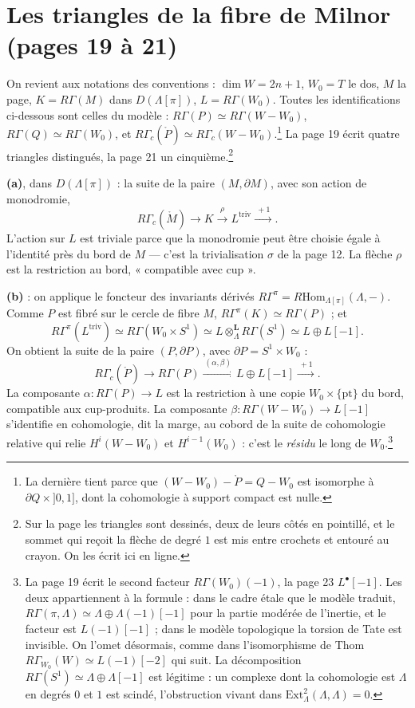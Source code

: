 \documentclass[11pt,a4paper]{article}
\begin{document}
\section*{Les triangles de la fibre de Milnor (pages 19 à 21)}

On revient aux notations des conventions : $\dim W = 2n+1$, $W_0 = T$ le dos,
$M$ la page, $K = R\Gamma(M)$ dans $D(\Lambda[\pi])$, $L = R\Gamma(W_0)$. Toutes
les identifications ci-dessous sont celles du modèle : $R\Gamma(P) \simeq
R\Gamma(W - W_0)$, $R\Gamma(Q) \simeq R\Gamma(W_0)$, et
$R\Gamma_{c}(\mathring{P}) \simeq R\Gamma_{c}(W - W_0)$.\footnote{La dernière
tient parce que $(W - W_0) - \mathring{P} = Q - W_0$ est isomorphe à
$\partial Q \times {]0, 1]}$, dont la cohomologie à support compact est
nulle.} La page 19 écrit quatre triangles distingués, la page 21 un
cinquième.\footnote{Sur la page les triangles sont dessinés, deux de leurs
côtés en pointillé, et le sommet qui reçoit la flèche de degré $1$ est mis
entre crochets et entouré au crayon. On les écrit ici en ligne.}

\textbf{(a)}, dans $D(\Lambda[\pi])$ : la suite de la paire $(M, \partial M)$,
avec son action de monodromie,
\[
  R\Gamma_{c}(\mathring{M}) \longrightarrow K \xrightarrow{\ \rho\ } L^{\mathrm{triv}}
  \xrightarrow{\ +1\ } .
\]
L'action sur $L$ est triviale parce que la monodromie peut être choisie égale à
l'identité près du bord de $M$ — c'est la trivialisation $\sigma$ de la page
12. La flèche $\rho$ est la restriction au bord, « compatible avec cup ».

\textbf{(b)} : on applique le foncteur des invariants dérivés
$R\Gamma^{\pi} = R\mathrm{Hom}_{\Lambda[\pi]}(\Lambda, -)$. Comme $P$ est fibré
sur le cercle de fibre $M$, $R\Gamma^{\pi}(K) \simeq R\Gamma(P)$ ; et
\[
  R\Gamma^{\pi}(L^{\mathrm{triv}}) \simeq R\Gamma(W_0 \times S^{1})
  \simeq L \otimes^{\mathbf{L}}_{\Lambda} R\Gamma(S^{1}) \simeq L \oplus L[-1] .
\]
On obtient la suite de la paire $(P, \partial P)$, avec
$\partial P = S^{1} \times W_0$ :
\[
  R\Gamma_{c}(\mathring{P}) \longrightarrow R\Gamma(P)
  \xrightarrow{\ (\alpha, \beta)\ } L \oplus L[-1] \xrightarrow{\ +1\ } .
\]
La composante $\alpha : R\Gamma(P) \to L$ est la restriction à une copie
$W_0 \times \{\mathrm{pt}\}$ du bord, compatible aux cup-produits. La
composante $\beta : R\Gamma(W - W_0) \to L[-1]$ s'identifie en cohomologie,
dit la marge, au cobord de la suite de cohomologie relative qui relie
$H^{i}(W - W_0)$ et $H^{i-1}(W_0)$ : c'est le \emph{résidu} le long de
$W_0$.\footnote{La page 19 écrit le second facteur $R\Gamma(W_0)(-1)$, la page
23 $L^{\bullet}[-1]$. Les deux appartiennent à la formule : dans le cadre
étale que le modèle traduit, $R\Gamma(\pi, \Lambda) \simeq \Lambda \oplus
\Lambda(-1)[-1]$ pour la partie modérée de l'inertie, et le facteur est
$L(-1)[-1]$ ; dans le modèle topologique la torsion de Tate est invisible. On
l'omet désormais, comme dans l'isomorphisme de Thom
$R\Gamma_{W_0}(W) \simeq L(-1)[-2]$ qui suit. La décomposition
$R\Gamma(S^{1}) \simeq \Lambda \oplus \Lambda[-1]$ est légitime : un complexe
dont la cohomologie est $\Lambda$ en degrés $0$ et $1$ est scindé, l'obstruction
vivant dans $\mathrm{Ext}^{2}_{\Lambda}(\Lambda, \Lambda) = 0$.}
\end{document}
